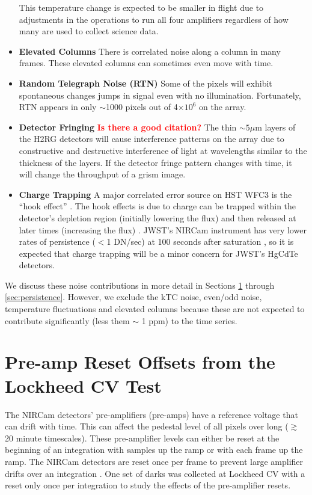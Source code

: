 \documentclass[]{aastex62}
\begin{document}
\begin{itemize}[noitemsep]
	This temperature change is expected to be smaller in flight due to adjustments in the operations to run all four amplifiers regardless of how many are used to collect science data.
	\item \textbf{Elevated Columns} There is correlated noise along a column in many frames. These elevated columns can sometimes even move with time.
	\item \textbf{Random Telegraph Noise (RTN)} Some of the pixels will exhibit spontaneous changes jumps in signal even with no illumination. Fortunately, RTN appears in only $\sim$1000 pixels out of 4$\times 10^6$ on the array.
	\item \textbf{Detector Fringing} \textbf{\textcolor{red}{Is there a good citation?}} The thin $\sim 5\mu$m layers of the H2RG detectors will cause interference patterns on the array due to constructive and destructive interference of light at wavelengths similar to the thickness of the layers. If the detector fringe pattern changes with time, it will change the throughput of a grism image.
	\item \textbf{Charge Trapping} A major correlated error source on HST WFC3 is the ``hook effect'' \citep{berta2012flat_gj1214}.
	The hook effects is due to charge can be trapped within the detector's depletion region (initially lowering the flux) and then released at later times (increasing the flux) \citep{zhou2017chargeTrap}.
	JWST's NIRCam instrument has very lower rates of persistence ($<$1 DN/sec) at 100 seconds after saturation \citep{leisenring2016persistence}, so it is expected that charge trapping will be a minor concern for JWST's HgCdTe detectors.
\end{itemize}

We discuss these noise contributions in more detail in Sections \ref{sec:preAmp} through \ref{sec:persistence}.
However, we exclude the kTC noise, even/odd noise, temperature fluctuations and elevated columns because these are not expected to contribute significantly (less them $\sim$ 1 ppm) to the time series.


\section{Pre-amp Reset Offsets from the Lockheed CV Test}\label{sec:preAmp}

The NIRCam detectors' pre-amplifiers (pre-amps) have a reference voltage that can drift with time.
This can affect the pedestal level of all pixels over long ($\gtrsim$ 20 minute timescales).
These pre-amplifier levels can either be reset at the beginning of an integration with samples up the ramp or with each frame up the ramp.
The NIRCam detectors are reset once per frame to prevent large amplifier drifts over an integration \citep{robberto2014refPixPreAmp}.
One set of darks was collected at Lockheed CV with a reset only once per integration to study the effects of the pre-amplifier resets.
\end{document}
